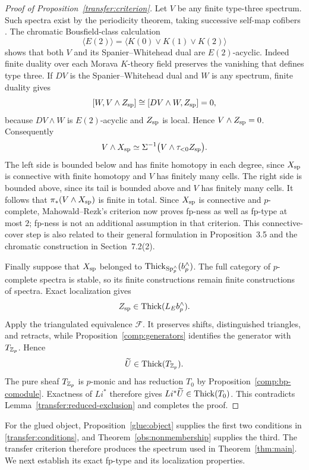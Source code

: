 \begin{proof}[Proof of Proposition~\ref{transfer:criterion}]
Let $V$ be any finite type-three spectrum. Such spectra exist by
the periodicity theorem, taking successive self-map cofibers
\cite[Theorem~1.5.4 and Corollary~2.3.5]{Ravenel1992}. The chromatic
Bousfield-class calculation \cite[Theorem~7.3.2(d)]{Ravenel1992}
\[
 \langle E(2)\rangle
   =\langle K(0)\vee K(1)\vee K(2)\rangle
\]
shows that both $V$ and its Spanier--Whitehead dual are
$E(2)$-acyclic. Indeed finite duality over each Morava $K$-theory
field preserves the vanishing that defines type three. If $DV$ is the
Spanier--Whitehead dual and $W$ is any spectrum, finite duality gives
\[
 [W,V\wedge Z_{\rm sp}]\cong[DV\wedge W,Z_{\rm sp}]=0,
\]
because $DV\wedge W$ is $E(2)$-acyclic and $Z_{\rm sp}$ is local. Hence
$V\wedge Z_{\rm sp}=0$. Consequently
\[
 V\wedge X_{\rm sp}
   \simeq\Sigma^{-1}\bigl(V\wedge\tau_{<0}Z_{\rm sp}\bigr).
\]
The left side is bounded below and has finite homotopy in each
degree, since $X_{\rm sp}$ is connective with finite homotopy and
$V$ has finitely many cells. The right side is bounded above,
since its tail is bounded above and $V$ has finitely many cells.
It follows that $\pi_*(V\wedge X_{\rm sp})$ is finite in total.
Since $X_{\rm sp}$ is connective and $p$-complete,
Mahowald--Rezk's criterion \cite[Proposition~3.2]{MR1999} now
proves fp-ness as well as fp-type at most $2$; fp-ness is not an
additional assumption in that criterion. This connective-cover step
is also related to their general formulation in Proposition~3.5 and
the chromatic construction in Section~7.2(2).

Finally suppose that $X_{\rm sp}$ belonged to
$\operatorname{Thick}_{\mathrm{Sp}_p^\wedge}(b_p^\wedge)$. The full category of
$p$-complete spectra is stable, so its finite constructions remain
finite constructions of spectra. Exact localization gives
\[
 Z_{\rm sp}\in\operatorname{Thick}(L_Eb_p^\wedge).
\]
Apply the triangulated equivalence $\mathcal F$. It preserves shifts,
distinguished triangles, and retracts, while
Proposition~\ref{comp:generators} identifies the generator with
$T_{\mathbb Z_p}$. Hence
\[
 \widetilde U\in\operatorname{Thick}(T_{\mathbb Z_p}).
\]
The pure sheaf $T_{\mathbb Z_p}$ is $p$-monic and has reduction $T_0$ by
Proposition~\ref{comp:bp-comodule}. Exactness of $Li^*$ therefore gives
$Li^*\widetilde U\in\operatorname{Thick}(T_0)$. This contradicts
Lemma~\ref{transfer:reduced-exclusion} and completes the proof.
\end{proof}

For the glued object, Proposition~\ref{glue:object} supplies the first
two conditions in \eqref{transfer:conditions}, and
Theorem~\ref{obs:nonmembership} supplies the third. The transfer
criterion therefore produces the spectrum used in
Theorem~\ref{thm:main}. We next establish its exact fp-type and its
localization properties.
